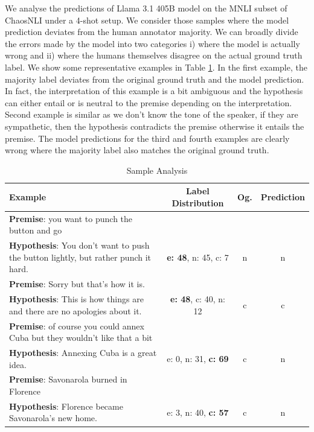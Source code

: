 We analyse the predictions of Llama 3.1 405B model on the MNLI subset of ChaosNLI under a 4-shot setup. We consider those samples where the model prediction deviates from the human annotator majority. We can broadly divide the errors made by the model into two categories i) where the model is actually wrong and ii) where the humans themselves disagree on the actual ground truth label. We show some representative examples in Table \ref{tab:sample_analysis}. In the first example, the majority label deviates from the original ground truth and the model prediction. In fact, the interpretation of this example is a bit ambiguous and the hypothesis can either entail or is neutral to the premise depending on the interpretation. Second example is similar as we don't know the tone of the speaker, if they are sympathetic, then the hypothesis contradicts the premise otherwise it entails the premise. The model predictions for the third and fourth examples are clearly wrong where the majority label also matches the original ground truth.



\begin{table}[t]
\centering
\small
\begin{tabular}{p{8cm}|c|c|c}
\toprule
\textbf{Example} & \textbf{Label Distribution} & \textbf{Og.} & \textbf{Prediction} \\
\midrule
\textbf{Premise}: you want to punch the button and go\\
\textbf{Hypothesis}: You don't want to push the button lightly, but rather punch it hard. & \textbf{e: 48}, n: 45, c: 7 & n & n \\
\midrule
\textbf{Premise}: Sorry but that's how it is.\\
\textbf{Hypothesis}: This is how things are and there are no apologies about it. & \textbf{e: 48}, c: 40, n: 12 & c & c \\
\midrule
\textbf{Premise}: of course you could annex Cuba but they wouldn't like that a bit\\
\textbf{Hypothesis}: Annexing Cuba is a great idea. & e: 0, n: 31, \textbf{c: 69} & c & n \\
\midrule
\textbf{Premise}: Savonarola burned in Florence\\
\textbf{Hypothesis}: Florence became Savonarola's new home. & e: 3, n: 40, \textbf{c: 57} & c & n \\
\bottomrule
\end{tabular}
\caption{Sample Analysis}
\label{tab:sample_analysis}
\end{table}

